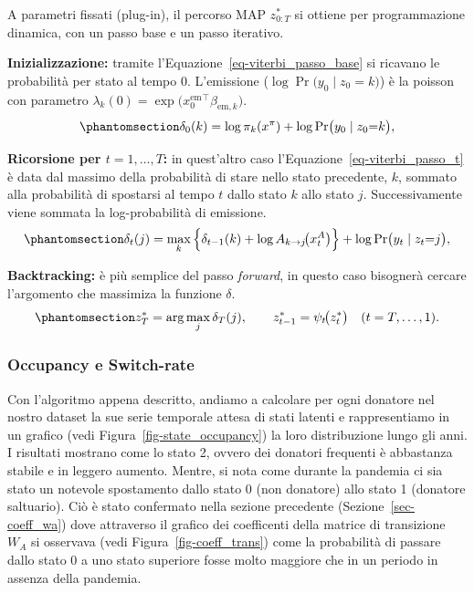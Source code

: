 \documentclass[
  italian,
  a4paper,
  a4paper,
  twoside,
  open=right,
  12pt]{scrbook}
\theoremstyle{definition}
\theoremstyle{remark}
\begin{document}
A parametri fissati (plug-in), il percorso MAP \(z_{0:T}^*\) si ottiene
per programmazione dinamica, con un passo base e un passo iterativo.

\textbf{Inizializzazione:} tramite
l'Equazione~\ref{eq-viterbi_passo_base} si ricavano le probabilità per
stato al tempo 0. L'emissione (\(\log \Pr\bigl(y_0\mid z_0{=}k\bigr)\))
è la poisson con parametro
\(\lambda_k(0)=\exp\!\bigl(x^{\text{em}}_0{}^\top\beta_{\text{em},k}\bigr)\).
\begin{equation}\phantomsection\label{eq-viterbi_passo_base}{
\delta_0(k)=\log \pi_k(x^\pi) + \log \Pr\bigl(y_0\mid z_0{=}k\bigr),
}\end{equation}

\textbf{Ricorsione per \(t=1,\dots,T\):} in quest'altro caso
l'Equazione~\ref{eq-viterbi_passo_t} è data dal massimo della
probabilità di stare nello stato precedente, \(k\), sommato alla
probabilità di spostarsi al tempo \(t\) dallo stato \(k\) allo stato
\(j\). Successivamente viene sommata la log-probabilità di emissione.
\begin{equation}\phantomsection\label{eq-viterbi_passo_t}{
\delta_t(j)=\max_{k}\Big\{\delta_{t-1}(k) + \log A_{k\to j}\!\bigl(x^A_t\bigr)\Big\} + \log \Pr\bigl(y_t\mid z_t{=}j\bigr),
}\end{equation}

\textbf{Backtracking:} è più semplice del passo \emph{forward}, in
questo caso bisognerà cercare l'argomento che massimiza la funzione
\(\delta\).
\begin{equation}\phantomsection\label{eq-viterbi_back_tracking}{
z_T^*=\arg\max_j \delta_T(j),\qquad
z_{t-1}^*=\psi_t\!\bigl(z_t^*\bigr)\quad (t=T,\dots,1).
}\end{equation}

\subsubsection{Occupancy e Switch-rate}\label{occupancy-e-switch-rate}

Con l'algoritmo appena descritto, andiamo a calcolare per ogni donatore
nel nostro dataset la sue serie temporale attesa di stati latenti e
rappresentiamo in un grafico (vedi Figura~\ref{fig-state_occupancy}) la
loro distribuzione lungo gli anni. I risultati mostrano come lo stato 2,
ovvero dei donatori frequenti è abbastanza stabile e in leggero aumento.
Mentre, si nota come durante la pandemia ci sia stato un notevole
spostamento dallo stato 0 (non donatore) allo stato 1 (donatore
saltuario). Ciò è stato confermato nella sezione precedente
(Sezione~\ref{sec-coeff_wa}) dove attraverso il grafico dei coefficenti
della matrice di transizione \(W_A\) si osservava (vedi
Figura~\ref{fig-coeff_trans}) come la probabilità di passare dallo stato
0 a uno stato superiore fosse molto maggiore che in un periodo in
assenza della pandemia.
\end{document}
